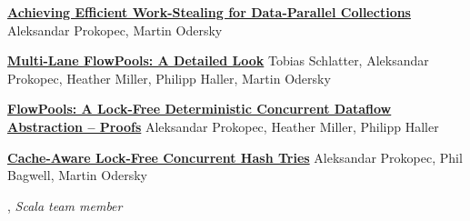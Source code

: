\documentclass[9pt]{article}
\begin{document}



\noindent\href{http://infoscience.epfl.ch/record/186071}
{\bf  Achieving Efficient Work-Stealing for Data-Parallel Collections}
\newline\noindent Aleksandar Prokopec, Martin Odersky
\medskip

\noindent\href{http://infoscience.epfl.ch/record/198208}
{\bf  Multi-Lane FlowPools: A Detailed Look}
\newline\noindent Tobias Schlatter, Aleksandar Prokopec, Heather Miller,
\newline\noindent Philipp Haller, Martin Odersky
\medskip

\noindent\href{http://infoscience.epfl.ch/record/181098}
{\bf  FlowPools: A Lock-Free Deterministic Concurrent Dataflow }
\newline
\noindent\href{http://infoscience.epfl.ch/record/181098}
{\bf  Abstraction -- Proofs}
\dates{}
\newline\noindent Aleksandar Prokopec, Heather Miller, Philipp Haller
\medskip

\noindent\href{http://infoscience.epfl.ch/record/166908/files/ctries-techreport.pdf}
{\bf Cache-Aware Lock-Free Concurrent Hash Tries}
\newline\noindent Aleksandar Prokopec, Phil Bagwell, Martin Odersky
\medskip

\medskip
{}

\vspace{0.01in}
, {\em Scala team member} 
\end{document}
